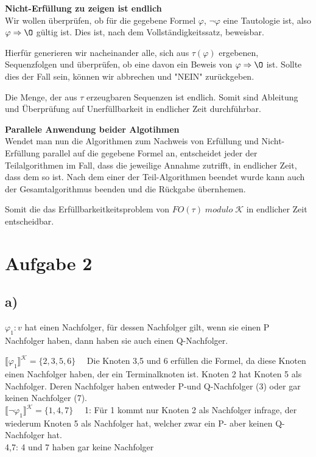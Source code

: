 \documentclass[11pt, a4paper]{article}
\begin{document}
\null
\textbf{Nicht-Erfüllung zu zeigen ist endlich}\\
Wir wollen überprüfen, ob für die gegebene Formel $\varphi$, $\neg\varphi$ eine Tautologie ist, also $\varphi \Rightarrow \O$ gültig ist.
Dies ist, nach dem Vollständigkeitssatz, beweisbar.

Hierfür generieren wir nacheinander alle, sich aus $\tau(\varphi)$ ergebenen, Sequenzfolgen und überprüfen, ob eine davon ein Beweis von $\varphi \Rightarrow \O$ ist.
Sollte dies der Fall sein, können wir abbrechen und "NEIN" zurückgeben.

Die Menge, der aus $\tau$ erzeugbaren Sequenzen ist endlich.
Somit sind Ableitung und Überprüfung auf Unerfüllbarkeit in endlicher Zeit durchführbar.

\null
\textbf{Parallele Anwendung beider Algotihmen}\\
Wendet man nun die Algorithmen zum Nachweis von Erfüllung und Nicht-Erfüllung parallel auf die gegebene Formel an, entscheidet jeder der Teilalgorithmen im Fall, dass die jeweilige Annahme zutrifft, in endlicher Zeit, dass dem so ist. Nach dem einer der Teil-Algorithmen beendet wurde kann auch der Gesamtalgorithmus beenden und die Rückgabe übernhemen.

Somit die das Erfüllbarkeitkeitsproblem von $FO(\tau) \; modulo \; \mathcal{K}$ in endlicher Zeit entscheidbar.


\section*{Aufgabe 2}

\subsection*{a)}
$\varphi_1: v$ hat einen Nachfolger, für dessen Nachfolger gilt, wenn sie einen P Nachfolger haben, dann haben sie auch einen Q-Nachfolger.

$\llbracket \varphi_1 \rrbracket^{\mathcal{K}} = \{2, 3, 5, 6\}\quad$ Die Knoten 3,5 und 6 erfüllen die Formel, da diese Knoten einen Nachfolger haben, der ein Terminalknoten ist.
Knoten 2 hat Knoten 5 als Nachfolger.
Deren Nachfolger haben entweder P-und Q-Nachfolger (3) oder gar keinen Nachfolger (7).\\

$\llbracket \neg\varphi_1 \rrbracket^{\mathcal{K}} = \{1,4,7\}\quad$ 1: Für 1 kommt nur Knoten 2 als Nachfolger infrage, der wiederum Knoten 5 als Nachfolger hat, welcher zwar ein P- aber keinen Q-Nachfolger hat.\\
4,7: 4 und 7 haben gar keine Nachfolger
\end{document}
